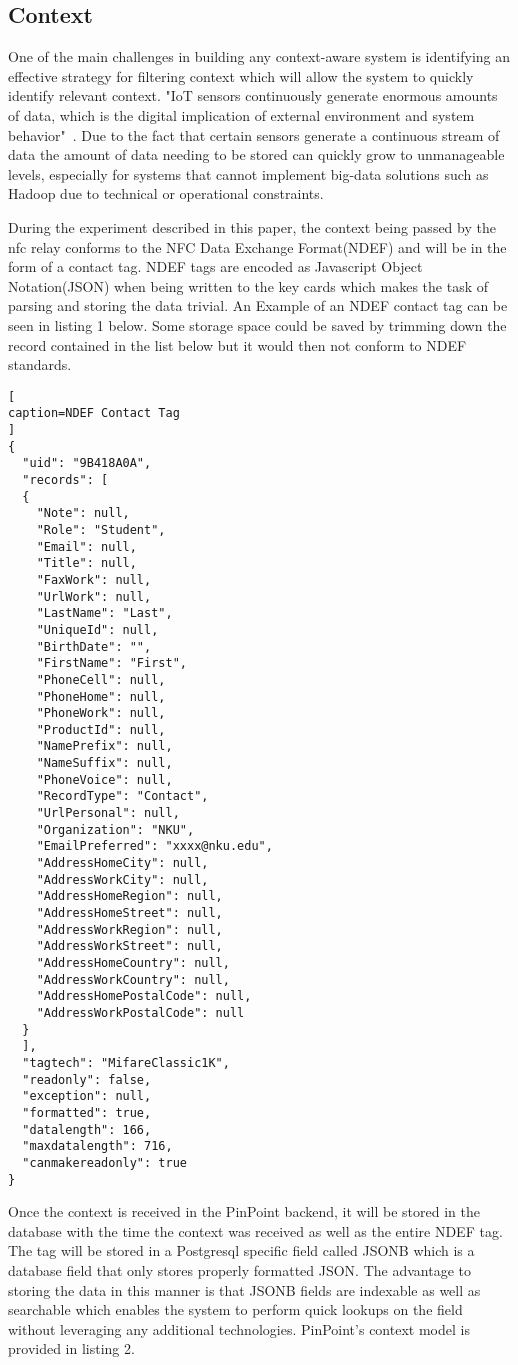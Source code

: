 \documentclass[11pt,journal]{IEEEtran}
\begin{document}
\subsection{Context}
One of the main challenges in building any context-aware system is identifying an effective strategy for filtering context which will allow the system to quickly identify relevant context.  "IoT sensors continuously generate enormous amounts of data, which is the digital implication of external environment and system behavior"~\cite{Song:2018:TIC:3180374.3181341}.  Due to the fact that certain sensors generate a continuous stream of data the amount of data needing to be stored can quickly grow to unmanageable levels, especially for systems that cannot implement big-data solutions such as Hadoop due to technical or operational constraints.

During the experiment described in this paper, the context being passed by the nfc relay conforms to the NFC Data Exchange Format(NDEF) and will be in the form of a contact tag. NDEF tags are encoded as Javascript Object Notation(JSON) when being written to the key cards which makes the task of parsing and storing the data trivial. An Example of an NDEF contact tag can be seen in listing 1 below.  Some storage space could be saved by trimming down the record contained in the list below but it would then not conform to NDEF standards.

\begin{lstlisting}[
caption=NDEF Contact Tag
]
{
  "uid": "9B418A0A",
  "records": [
  {
    "Note": null,
	"Role": "Student",
	"Email": null,
	"Title": null,
	"FaxWork": null,
	"UrlWork": null,
	"LastName": "Last",
	"UniqueId": null,
	"BirthDate": "",
	"FirstName": "First",
	"PhoneCell": null,
	"PhoneHome": null,
	"PhoneWork": null,
	"ProductId": null,
	"NamePrefix": null,
	"NameSuffix": null,
	"PhoneVoice": null,
	"RecordType": "Contact",
	"UrlPersonal": null,
	"Organization": "NKU",
	"EmailPreferred": "xxxx@nku.edu",
	"AddressHomeCity": null,
	"AddressWorkCity": null,
	"AddressHomeRegion": null,
	"AddressHomeStreet": null,
	"AddressWorkRegion": null,
	"AddressWorkStreet": null,
	"AddressHomeCountry": null,
	"AddressWorkCountry": null,
	"AddressHomePostalCode": null,
	"AddressWorkPostalCode": null
  }
  ],
  "tagtech": "MifareClassic1K",
  "readonly": false,
  "exception": null,
  "formatted": true,
  "datalength": 166,
  "maxdatalength": 716,
  "canmakereadonly": true
}
\end{lstlisting}

Once the context is received in the PinPoint backend, it will be stored in the database with the time the context was received as well as the entire NDEF tag.  The tag will be stored in a Postgresql specific field called JSONB which is a database field that only stores properly formatted JSON.  The advantage to storing the data in this manner is that JSONB fields are indexable as well as searchable which enables the system to perform quick lookups on the field without leveraging any additional technologies. PinPoint's context model is provided in listing 2.
\end{document}
